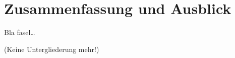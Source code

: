 
\chapter{Zusammenfassung und Ausblick}
\label{ch:Zusammenfassung}
Bla fasel\ldots

(Keine Untergliederung mehr!)

